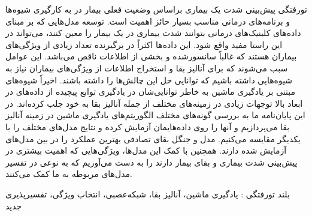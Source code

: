 


\pagestyle{empty}

‌تورفتگی
پیش‌بینی شدت یک بیماری براساس وضعیت فعلی بیمار در به کارگیری شیوه‌ها و برنامه‌های درمانی مناسب بسیار حائز اهمیت است. توسعه مدل‌هایی که بر مبنای داده‌های کلینیک‌های درمانی بتوانند شدت بیماری در یک بیمار را معین کنند، می‌تواند در این راستا مفید واقع شود.   این داده‌ها اکثراً در برگیرنده تعداد زیادی از ویژگی‌های بیماران هستند که غالباً سانسورشده و بخشی از اطلاعات ناقص می‌باشد. این عوامل سبب می‌شوند که برای آنالیز بقا و استخراج اطلاعات از ویژگی‌های بیماران نیاز به شیوه‌هایی داشته باشیم که توانایی حل این چالش‌ها را داشته باشند. اخیراً شیوه‌های مبتنی بر یادگیری ماشین به خاطر توانایی‌شان در یادگیری توابع پیچیده از داده‌های در ابعاد بالا توجهات زیادی در زمینه‌های مختلف از جمله آنالیز بقا به خود جلب کرده‌اند. در این پایان‌نامه ما به بررسی گونه‌های مختلف الگوریتم‌های یادگیری ماشین در زمینه آنالیز بقا می‌پردازیم و آنها را روی داده‌هایمان آزمایش کرده و نتایج مدل‌های مختلف را با یکدیگر مقایسه می‌کنیم.  مدل  و جنگل بقای تصادفی بهترین عملکرد را در بین مدل‌های آزمایش شده دارند. همچنین با کمک این مدل‌ها، ویژگی‌هایی که اهمیت بیشتری در پیش‌بینی شدت بیماری و بقای بیمار دارند را به دست می‌آوریم که به نوعی در تفسیر مدل‌های مربوطه به ما کمک می‌کنند.

‌بلند
‌تورفتگی : 
یادگیری ماشین، آنالیز بقا، شبکه‌عصبی، انتخاب ویژگی، تفسیر‌پذیری	
‌جدید
